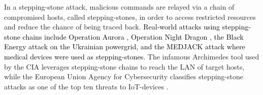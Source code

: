 \documentclass[runningheads,11pt]{llncs}\usepackage[]{graphicx}\usepackage[]{color}
\begin{document}
In a stepping-stone attack, malicious commands are relayed via a chain of compromised hosts, called stepping-stones, in order to access restricted resources and reduce the chance of being traced back. \textcolor{black}{Real-world attacks using stepping-stone chains include Operation Aurora \cite{tankard2011advanced}, Operation Night Dragon \cite{mcafee2015report}, the Black Energy \cite{eisac2017report} attack on the Ukrainian powergrid, and the MEDJACK \cite{ayala2016active} attack where medical devices were used as stepping-stones.} The infamous Archimedes tool \cite{archimedes2017} used by the CIA leverages stepping-stone chains to reach the LAN of target hosts, while the European Union Agency for Cybersecurity classifies stepping-stone attacks as one of the top ten threats to IoT-devices \cite{enisa2017baseline}.




\end{document}
